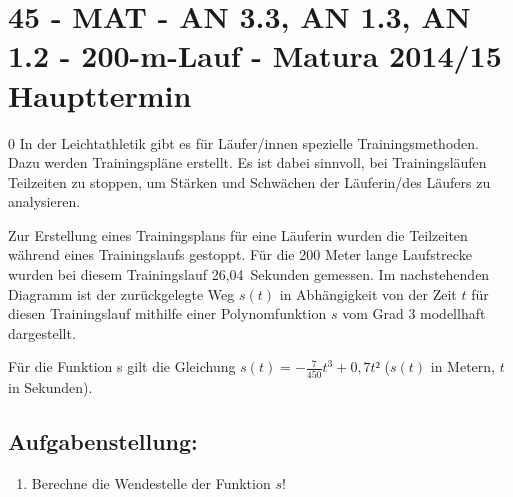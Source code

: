 \section{45 - MAT - AN 3.3, AN 1.3, AN 1.2 - 200-m-Lauf - Matura 2014/15 Haupttermin}

\begin{langesbeispiel} \item[0] %
				 In der Leichtathletik gibt es für Läufer/innen spezielle Trainingsmethoden. Dazu werden Trainingspläne erstellt. Es ist dabei sinnvoll, bei Trainingsläufen Teilzeiten zu stoppen, um Stärken und Schwächen der Läuferin/des Läufers zu analysieren.
				
				Zur Erstellung eines Trainingsplans für eine Läuferin wurden die Teilzeiten während eines Trainingslaufs gestoppt. Für die 200 Meter lange Laufstrecke wurden bei diesem Trainingslauf 26,04 Sekunden gemessen. Im nachstehenden Diagramm ist der zurückgelegte Weg $s(t)$ in Abhängigkeit von der Zeit $t$ für diesen Trainingslauf mithilfe einer Polynomfunktion $s$ vom Grad 3 modellhaft dargestellt. 
				
Für die Funktion s gilt die Gleichung $s(t)=-\frac{7}{450}t^3+0,7t²$ ($s(t)$ in Metern, $t$ in Sekunden).

\begin{center}
\end{center}

\subsection{Aufgabenstellung:}
\begin{enumerate}
	\item Berechne die Wendestelle der Funktion $s$!
	

\end{enumerate}
\end{langesbeispiel}
